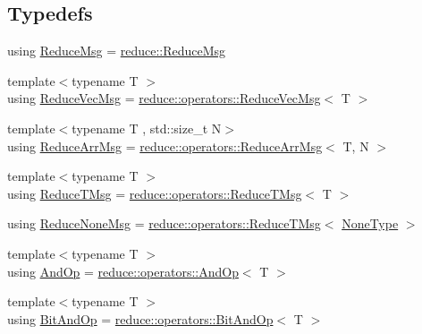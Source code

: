 \subsection*{Typedefs}
\begin{DoxyCompactItemize}
\item 
using \hyperlink{namespacevt_1_1collective_a4c5bf7769ad4396573d6bcc85ec430a4}{Reduce\+Msg} = \hyperlink{structvt_1_1collective_1_1reduce_1_1_reduce_msg}{reduce\+::\+Reduce\+Msg}
\item 
{\footnotesize template$<$typename T $>$ }\\using \hyperlink{namespacevt_1_1collective_a711b5dd8547fee4b63077f44188959f4}{Reduce\+Vec\+Msg} = \hyperlink{structvt_1_1collective_1_1reduce_1_1operators_1_1_reduce_vec_msg}{reduce\+::operators\+::\+Reduce\+Vec\+Msg}$<$ T $>$
\item 
{\footnotesize template$<$typename T , std\+::size\+\_\+t N$>$ }\\using \hyperlink{namespacevt_1_1collective_a12eddadcf360fcb9d05149e2d8aa327a}{Reduce\+Arr\+Msg} = \hyperlink{structvt_1_1collective_1_1reduce_1_1operators_1_1_reduce_arr_msg}{reduce\+::operators\+::\+Reduce\+Arr\+Msg}$<$ T, N $>$
\item 
{\footnotesize template$<$typename T $>$ }\\using \hyperlink{namespacevt_1_1collective_a28b82d5d48c9bc6e4fd738fcbf9e0f62}{Reduce\+T\+Msg} = \hyperlink{namespacevt_1_1collective_1_1reduce_1_1operators_a85097552afc7e87d5d5092f068223ca0}{reduce\+::operators\+::\+Reduce\+T\+Msg}$<$ T $>$
\item 
using \hyperlink{namespacevt_1_1collective_aa439a90f05078f2bcf918641c951946f}{Reduce\+None\+Msg} = \hyperlink{namespacevt_1_1collective_1_1reduce_1_1operators_a85097552afc7e87d5d5092f068223ca0}{reduce\+::operators\+::\+Reduce\+T\+Msg}$<$ \hyperlink{namespacevt_1_1collective_af988b64711231f96d33ebfaf891e52a4}{None\+Type} $>$
\item 
{\footnotesize template$<$typename T $>$ }\\using \hyperlink{namespacevt_1_1collective_ae6f54eb36ce2d4203174e55167c4cd87}{And\+Op} = \hyperlink{structvt_1_1collective_1_1reduce_1_1operators_1_1_and_op}{reduce\+::operators\+::\+And\+Op}$<$ T $>$
\item 
{\footnotesize template$<$typename T $>$ }\\using \hyperlink{namespacevt_1_1collective_a64c800cae2fcb4ec24d2c5540cca0f9e}{Bit\+And\+Op} = \hyperlink{structvt_1_1collective_1_1reduce_1_1operators_1_1_bit_and_op}{reduce\+::operators\+::\+Bit\+And\+Op}$<$ T $>$

\end{DoxyCompactItemize}
